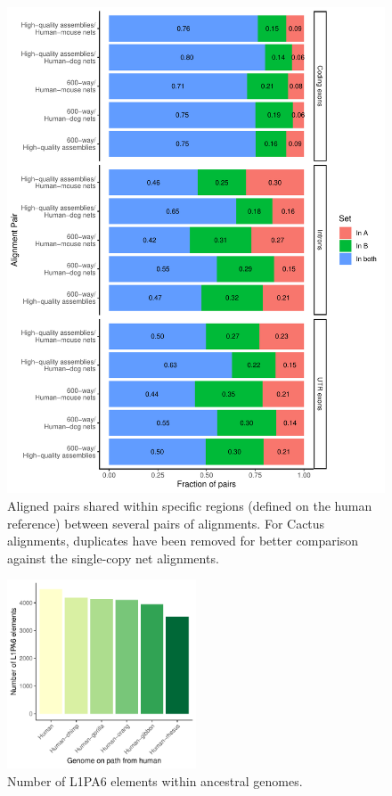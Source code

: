 \documentclass{article}
\begin{document}
\begin{figure}
\begin{center}
\includegraphics[width=\textwidth]{region_specific_aligned_pair_breakdown.pdf}
\caption{Aligned pairs shared within specific regions (defined on the human reference) between several pairs of alignments. For Cactus alignments, duplicates have been removed for better comparison against the single-copy net alignments.}\label{fig:regionSpecificJaccards}
\end{center}
\end{figure}

\begin{figure}
\begin{center}
\includegraphics[width=0.5\textwidth]{rm_ancestor_count.pdf}
\caption[Number of L1PA6 elements within ancestral genomes]{Number of L1PA6 elements within ancestral genomes.}\label{fig:rmAncestorCount}
\end{center}
\end{figure}
\end{document}
